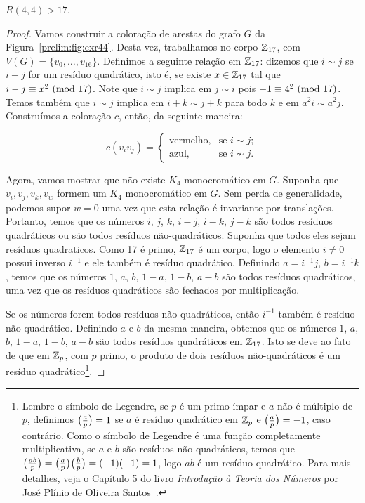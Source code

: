 \begin{proposition}
\label{prelim:thm:exr44}
$R(4,4) > 17$.
\end{proposition}
\begin{proof}
Vamos construir a coloração de arestas do grafo $G$ da Figura~\ref{prelim:fig:exr44}. Desta vez, trabalhamos no corpo $\mathbb{Z}_{17}$, com $V(G) = \{v_0,\dots,v_{16}\}$. Definimos a seguinte relação em $\mathbb{Z}_{17}$: dizemos que $i \sim j$ se $ i - j $ for um resíduo quadrático, isto é, se existe $x \in \mathbb{Z}_{17}$ tal que $i - j \equiv x^2 \ (\text{mod}\ 17)$.
Note que $i \sim j$ implica em $ j \sim i$ pois $-1 \equiv 4^2 \ (\text{mod}\ 17)$. Temos também que $i \sim j$ implica em $i + k \sim j + k$ para todo $k$ e em $a^2 i \sim a^2 j$. Construímos a coloração $c$, então, da seguinte maneira:

\[c(v_i v_j) = \begin{cases}
  \text{vermelho}, & \text{se } i \sim j; \\
  \text{azul}, & \text{se } i \not\sim j.
\end{cases}\]

Agora, vamos mostrar que não existe $K_4$ monocromático em $G$. Suponha que $v_i, v_j, v_k, v_w$ formem um $K_4$ monocromático em $G$. Sem perda de generalidade, podemos supor $w = 0$ uma vez que esta relação é invariante por translações. Portanto, temos que os números $i$, $j$, $k$, $i - j$, $i - k$, $j - k$ são todos resíduos quadráticos ou são todos resíduos não-quadráticos. Suponha que todos eles sejam resíduos quadraticos. Como 17 é primo, $\mathbb{Z}_{17}$ é um corpo, logo o elemento $i \neq 0$ possui inverso $i^{-1}$ e ele também é resíduo quadrático.
Definindo $a = i^{-1}j$, $b = i^{-1}k$, temos que os números $1$, $a$, $b$, $1 - a$, $1- b$, $a - b$ são todos resíduos quadráticos, uma vez que os resíduos quadráticos são fechados por multiplicação.

Se os números forem todos resíduos não-quadráticos, então $i^{-1}$ também é resíduo não-quadrático. Definindo $a$ e $b$ da mesma maneira, obtemos que os números $1$, $a$, $b$, $1 - a$, $1- b$, $a - b$ são todos resíduos quadráticos em $\mathbb{Z}_{17}$.
Isto se deve ao fato de que em $\mathbb{Z}_{p}$, com $p$ primo, o produto de dois resíduos não-quadráticos é um resíduo quadrático\footnote{Lembre o símbolo de Legendre, se $p$ é um primo ímpar e $a$ não é múltiplo de $p$, definimos $\big(\frac{a}{p}\big) = 1$ se $a$ é resíduo quadrático em $\mathbb{Z}_{p}$ e $\big(\frac{a}{p}\big) = -1$, caso contrário.
Como o símbolo de Legendre é uma função completamente multiplicativa, se $a$ e $b$ são resíduos não quadráticos, temos que $\big(\frac{ab}{p}\big) = \big(\frac{a}{p}\big) \big(\frac{b}{p}\big) = (-1)(-1) = 1$, logo $ab$ é um resíduo quadrático. Para mais detalhes, veja o Capítulo 5 do livro \emph{Introdução à Teoria dos Números} por José Plínio de Oliveira Santos~\cite{plinio}.}.


\end{proof}
